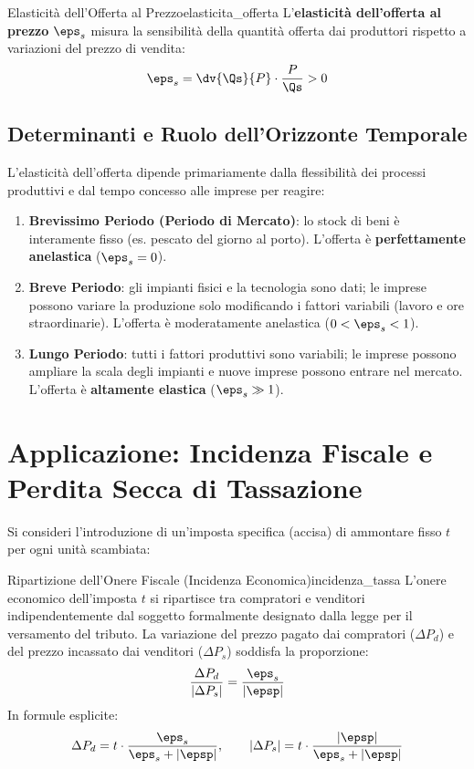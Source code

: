 \begin{definizione}{Elasticità dell'Offerta al Prezzo}{elasticita_offerta}
L'\textbf{elasticità dell'offerta al prezzo} $\eps_s$ misura la sensibilità della quantità offerta dai produttori rispetto a variazioni del prezzo di vendita:
\begin{equation}
    \eps_s = \dv{\Qs}{P} \cdot \frac{P}{\Qs} > 0
\end{equation}
\end{definizione}

\subsection{Determinanti e Ruolo dell'Orizzonte Temporale}
L'elasticità dell'offerta dipende primariamente dalla flessibilità dei processi produttivi e dal tempo concesso alle imprese per reagire:
\begin{enumerate}
    \item \textbf{Brevissimo Periodo (Periodo di Mercato)}: lo stock di beni è interamente fisso (es. pescato del giorno al porto). L'offerta è \textbf{perfettamente anelastica} ($\eps_s = 0$).
    \item \textbf{Breve Periodo}: gli impianti fisici e la tecnologia sono dati; le imprese possono variare la produzione solo modificando i fattori variabili (lavoro e ore straordinarie). L'offerta è moderatamente anelastica ($0 < \eps_s < 1$).
    \item \textbf{Lungo Periodo}: tutti i fattori produttivi sono variabili; le imprese possono ampliare la scala degli impianti e nuove imprese possono entrare nel mercato. L'offerta è \textbf{altamente elastica} ($\eps_s \gg 1$).
\end{enumerate}

\section{Applicazione: Incidenza Fiscale e Perdita Secca di Tassazione}

Si consideri l'introduzione di un'imposta specifica (accisa) di ammontare fisso $t$ per ogni unità scambiata:

\begin{teorema}{Ripartizione dell'Onere Fiscale (Incidenza Economica)}{incidenza_tassa}
L'onere economico dell'imposta $t$ si ripartisce tra compratori e venditori indipendentemente dal soggetto formalmente designato dalla legge per il versamento del tributo.
La variazione del prezzo pagato dai compratori ($\Delta P_d$) e del prezzo incassato dai venditori ($\Delta P_s$) soddisfa la proporzione:
\begin{equation}
    \frac{\Delta P_d}{|\Delta P_s|} = \frac{\eps_s}{|\epsp|}
\end{equation}
In formule esplicite:
\begin{equation}
    \Delta P_d = t \cdot \frac{\eps_s}{\eps_s + |\epsp|}, \qquad |\Delta P_s| = t \cdot \frac{|\epsp|}{\eps_s + |\epsp|}
\end{equation}
\end{teorema}

